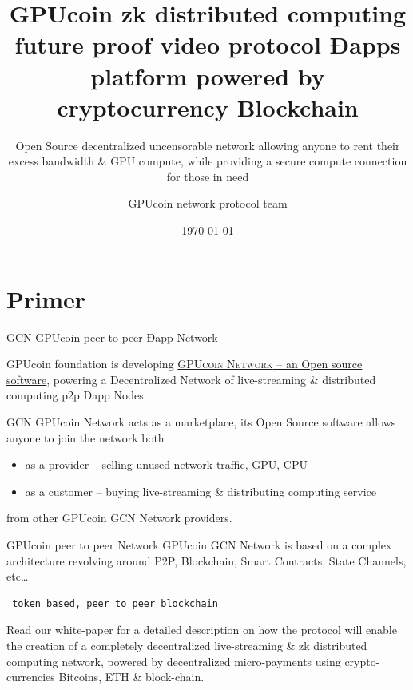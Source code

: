 \documentclass[10pt,handout]{beamer}
\title{GPUcoin zk distributed computing future proof video protocol Ðapps platform powered by cryptocurrency Blockchain}
\subtitle{Open Source decentralized uncensorable network allowing anyone to rent their excess bandwidth \& GPU compute, while providing a secure compute connection for those in need}
\date{\today}
\author{GPUcoin network protocol team}
\institute{ GPUcoin Foundation}
\newcommand{\themename}{\textbf{\textsc{metropolis}}\xspace}
\begin{document}
\maketitle


\section{Primer}

{%

\begin{frame}[fragile]{GCN GPUcoin peer to peer Ðapp Network }

 GPUcoin foundation is developing \href{https://onhoot.com/tokensale}{\textsc{GPUcoin Network} – an Open source software}, powering a Decentralized Network of live-streaming \& distributed computing p2p Ðapp Nodes.
 

GCN GPUcoin Network acts as a marketplace, its Open Source software allows anyone to join the network both 

\begin{itemize}
\item as a provider – selling unused network traffic, GPU, CPU
\item as a customer – buying live-streaming \& distributing computing service
\end{itemize}
 from other GPUcoin GCN Network providers. 
\end{frame}
}%
\begin{frame}[fragile]{GPUcoin peer to peer Network }
GPUcoin GCN Network is based on a complex architecture revolving around P2P, Blockchain, Smart Contracts, State Channels, etc\ldots
 \begin{verbatim} 
 token based, peer to peer blockchain 
 \end{verbatim}
 
 Read our white-paper for a detailed description on how the protocol will enable the creation of a completely decentralized live-streaming \& zk distributed computing network, powered by decentralized micro-payments using crypto-currencies Bitcoins, ETH \& block-chain. 


\end{frame}
\end{document}
